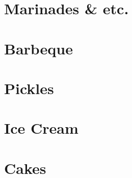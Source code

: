 \documentclass{family_cookbook}
\begin{document}
\chapter{Marinades \& etc.}
\minitoc%
\clearpage







\chapter{Barbeque}
\minitoc%
\clearpage




\chapter{Pickles}
\minitoc%
\clearpage

{%
	\let\section\subsection%
	\let\subsection\subsubsection%
	
	
	
}


\chapter{Ice Cream}
\minitoc%
\clearpage



\chapter{Cakes}
\minitoc%
\clearpage









%




\end{document}
